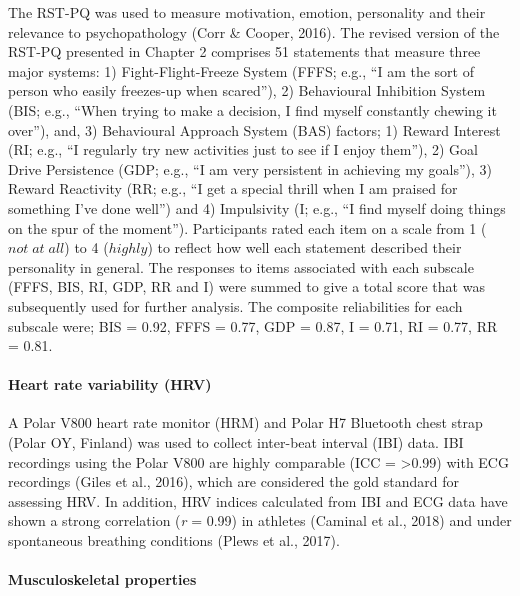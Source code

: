 \documentclass[man,floatsintext]{apa6}
\let\oldparagraph\paragraph
\renewcommand{\paragraph}[1]{\oldparagraph{#1}\mbox{}}
\begin{document}
The RST-PQ was used to measure motivation, emotion, personality and their relevance to psychopathology (Corr \& Cooper, 2016).
The revised version of the RST-PQ presented in Chapter 2 comprises 51 statements that measure three major systems:
1) Fight-Flight-Freeze System (FFFS; e.g., \enquote{I am the sort of person who easily freezes-up when scared}),
2) Behavioural Inhibition System (BIS; e.g., \enquote{When trying to make a decision, I find myself constantly chewing it over}), and,
3) Behavioural Approach System (BAS) factors;
1) Reward Interest (RI; e.g., \enquote{I regularly try new activities just to see if I enjoy them}),
2) Goal Drive Persistence (GDP; e.g., \enquote{I am very persistent in achieving my goals}),
3) Reward Reactivity (RR; e.g., \enquote{I get a special thrill when I am praised for something I've done well}) and
4) Impulsivity (I; e.g., \enquote{I find myself doing things on the spur of the moment}).
Participants rated each item on a scale from 1 (\(not\; at\; all\)) to 4 (\(highly\)) to reflect how well each statement described their personality in general.
The responses to items associated with each subscale (FFFS, BIS, RI, GDP, RR and I) were summed to give a total score that was subsequently used for further analysis.
The composite reliabilities for each subscale were; BIS = 0.92, FFFS = 0.77, GDP = 0.87, I = 0.71, RI = 0.77, RR = 0.81.

\hypertarget{heart-rate-variability-hrv-1}{%
\paragraph{Heart rate variability (HRV)}\label{heart-rate-variability-hrv-1}}

A Polar V800 heart rate monitor (HRM) and Polar H7 Bluetooth chest strap (Polar OY, Finland) was used to collect inter-beat interval (IBI) data.
IBI recordings using the Polar V800 are highly comparable (ICC = \textgreater0.99) with ECG recordings (Giles et al., 2016), which are considered the gold standard for assessing HRV.
In addition, HRV indices calculated from IBI and ECG data have shown a strong correlation (\emph{r} = 0.99) in athletes (Caminal et al., 2018) and under spontaneous breathing conditions (Plews et al., 2017).

\hypertarget{musculoskeletal-properties}{%
\paragraph{Musculoskeletal properties}\label{musculoskeletal-properties}}
\end{document}
